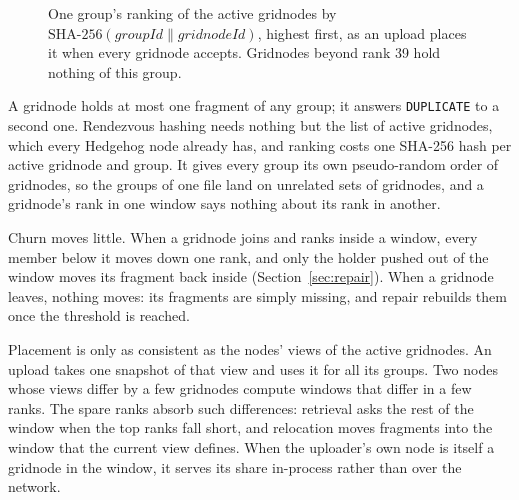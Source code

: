 \documentclass[10pt,a4paper,final]{article}
\newcommand{\code}[1]{\texttt{#1}}
\newcommand{\cat}{\mathbin{\|}}
\begin{document}
\begin{figure}[H]
\centering
{}
\caption{One group's ranking of the active gridnodes by $\mathrm{SHA\text{-}256}(\mathit{groupId} \cat
\mathit{gridnodeId})$, highest first, as an upload places it when every gridnode accepts. Gridnodes beyond rank 39
hold nothing of this group.}
\label{fig:window}
\end{figure}

A gridnode holds at most one fragment of any group; it answers \code{DUPLICATE} to a second one. Rendezvous hashing
needs nothing but the list of active gridnodes, which every Hedgehog node already has, and ranking costs one SHA-256
hash per active gridnode and group. It gives every group its own pseudo-random order of gridnodes, so the groups of
one file land on unrelated sets of gridnodes, and a gridnode's rank in one window says nothing about its rank in
another.

Churn moves little. When a gridnode joins and ranks inside a window, every member below it moves down one rank, and
only the holder pushed out of the window moves its fragment back inside (Section~\ref{sec:repair}). When a gridnode
leaves, nothing moves: its fragments are simply missing, and repair rebuilds them once the threshold is reached.

Placement is only as consistent as the nodes' views of the active gridnodes. An upload takes one snapshot of that
view and uses it for all its groups. Two nodes whose views differ by a few gridnodes compute windows that differ in a
few ranks. The spare ranks absorb such differences: retrieval asks the rest of the window when the top ranks fall
short, and relocation moves fragments into the window that the current view defines. When the uploader's own node
is itself a gridnode in the window, it serves its share in-process rather than over the network.
\end{document}
